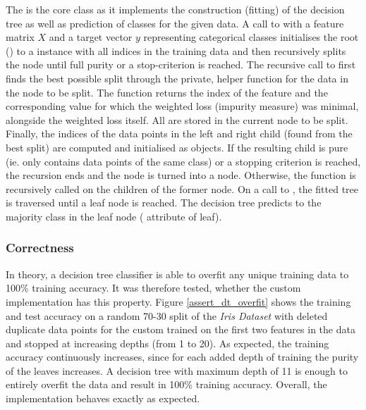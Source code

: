 The  is the core class as it implements the construction (fitting) of the decision tree as well as prediction of classes for the given data. A call to  with a feature matrix $X$ and a target vector $y$ representing categorical classes initialises the root () to a  instance with all indices in the training data and then recursively splits the node until full purity or a stop-criterion is reached. The recursive call to  first finds the best possible split through the private, helper function  for the data in the node to be split. The function returns the index of the feature and the corresponding value for which the weighted loss (impurity measure) was minimal, alongside the weighted loss itself. All are stored in the current node to be split.
Finally, the indices of the data points in the left and right child (found from the best split) are computed and initialised as  objects. If the resulting child is pure (ie. only contains data points of the same class) or a stopping criterion is reached, the recursion ends and the node is turned into a  node. Otherwise, the  function is recursively called on the children of the former node. On a call to , the fitted tree is traversed until a leaf node is reached. The decision tree predicts to the majority class in the leaf node ( attribute of leaf).



\subsubsection{Correctness}
In theory, a decision tree classifier is able to overfit any unique training data to 100\% training accuracy. It was therefore tested, whether the custom implementation has this property. Figure \ref{assert_dt_overfit} shows the training and test accuracy on a random 70-30 split of the \textit{Iris Dataset} with deleted duplicate data points for the custom  trained on the first two features in the data and stopped at increasing depths (from 1 to 20). As expected, the training accuracy continuously increases, since for each added depth of training the purity of the leaves increases. A decision tree with maximum depth of 11 is enough to entirely overfit the data and result in 100\% training accuracy. Overall, the implementation behaves exactly as expected. 
\newline

